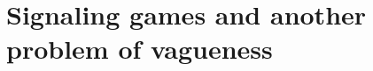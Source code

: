 \documentclass[a4paper]{article}
\begin{document}

\section{Signaling games and another problem of vagueness}
\label{sec:signaling-and-Lipman}
\end{document}
